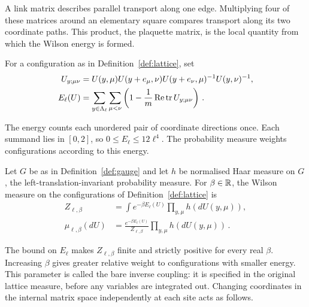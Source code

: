 A link matrix describes parallel transport along one edge.
Multiplying four of these matrices around an elementary square compares transport along its two coordinate paths.
This product, the plaquette matrix, is the local quantity from which the Wilson energy is formed.

\begin{definition}\label{def:plaquette}
For a configuration as in Definition~\ref{def:lattice}, set
\begin{equation}\label{eq:wilson-energy}
\begin{aligned}
U_{y;\mu\nu}&=U(y,\mu)U(y+e_\mu,\nu)U(y+e_\nu,\mu)^{-1}U(y,\nu)^{-1},\\
E_\ell(U)&=\sum_{y\in\Lambda_\ell}\sum_{\mu<\nu}
\left(1-\frac{1}{m}\operatorname{Re}\operatorname{tr} U_{y;\mu\nu}\right)\,.
\end{aligned}
\end{equation}
\end{definition}

The energy counts each unordered pair of coordinate directions once.
Each summand lies in $[0,2]$, so $0\le E_\ell\le12\ell^4$.
The probability measure weights configurations according to this energy.

\begin{definition}\label{def:wilson-law}
Let $G$ be as in Definition~\ref{def:gauge} and let $h$ be normalised Haar measure on $G$, the left-translation-invariant probability measure.
For $\beta\in\mathbb R$, the Wilson measure on the configurations of Definition~\ref{def:lattice} is
\begin{equation}\label{eq:wilson-law}
\begin{aligned}
Z_{\ell,\beta}&=\int e^{-\beta E_\ell(U)}\prod_{y,\mu}h(dU(y,\mu)),\\
\mu_{\ell,\beta}(dU)&=\frac{e^{-\beta E_\ell(U)}}{Z_{\ell,\beta}}\prod_{y,\mu}h(dU(y,\mu))\,.
\end{aligned}
\end{equation}
\end{definition}

The bound on $E_\ell$ makes $Z_{\ell,\beta}$ finite and strictly positive for every real $\beta$.
Increasing $\beta$ gives greater relative weight to configurations with smaller energy.
This parameter is called the bare inverse coupling: it is specified in the original lattice measure, before any variables are integrated out.
Changing coordinates in the internal matrix space independently at each site acts as follows.

